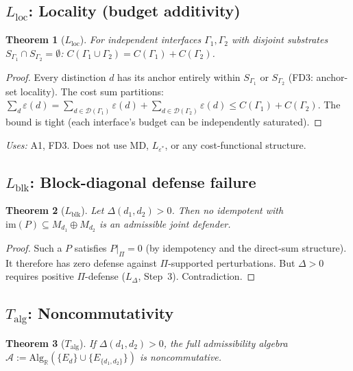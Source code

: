 \documentclass[11pt]{article}
\newtheorem{theorem_app}{Theorem}[section]
\theoremstyle{definition}
\begin{document}
\subsection{$L_{\mathrm{loc}}$: Locality (budget additivity)}
\label{app:Lloc}

\begin{theorem_app}[$L_{\mathrm{loc}}$]
For independent interfaces $\Gamma_1, \Gamma_2$ with disjoint
substrates $S_{\Gamma_1} \cap S_{\Gamma_2} = \emptyset$:
$C(\Gamma_1 \cup \Gamma_2) = C(\Gamma_1) + C(\Gamma_2)$.
\end{theorem_app}

\begin{proof}
Every distinction $d$ has its anchor entirely within $S_{\Gamma_1}$ or
$S_{\Gamma_2}$ (FD3: anchor-set locality).  The cost sum partitions:
$\sum_d \varepsilon(d) = \sum_{d \in \mathcal{D}(\Gamma_1)}
\varepsilon(d) + \sum_{d \in \mathcal{D}(\Gamma_2)} \varepsilon(d)
\le C(\Gamma_1) + C(\Gamma_2)$.  The bound is tight (each interface's
budget can be independently saturated).
\end{proof}

\noindent\textit{Uses:} A1, FD3.  Does not use MD, $L_{\varepsilon^*}$,
or any cost-functional structure.


\subsection{$L_{\mathrm{blk}}$: Block-diagonal defense failure}
\label{app:Lblk}

\begin{theorem_app}[$L_{\mathrm{blk}}$]
Let $\Delta(d_1,d_2) > 0$.  Then no idempotent with
$\mathrm{im}(P) \subseteq M_{d_1} \oplus M_{d_2}$ is an admissible
joint defender.
\end{theorem_app}

\begin{proof}
Such a $P$ satisfies $P|_\Pi = 0$ (by idempotency and the direct-sum
structure).  It therefore has zero defense against $\Pi$-supported
perturbations.  But $\Delta > 0$ requires positive $\Pi$-defense
($L_\Delta$, Step~3).  Contradiction.
\end{proof}


\subsection{$T_{\mathrm{alg}}$: Noncommutativity}
\label{app:Talg}

\begin{theorem_app}[$T_{\mathrm{alg}}$]
If $\Delta(d_1,d_2) > 0$, the full admissibility algebra
$\mathcal{A} := \mathrm{Alg}_\mathbb{R}(\{E_d\} \cup
\{E_{\{d_1,d_2\}}\})$ is noncommutative.
\end{theorem_app}
\end{document}

